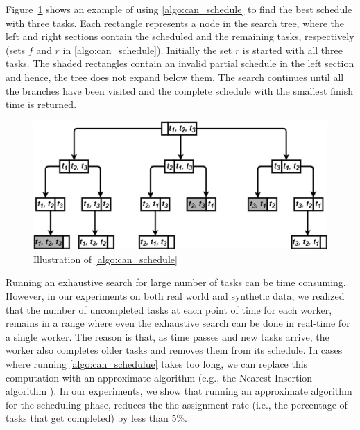 Figure~\ref{fig:bAndb} shows an example of using \cref{algo:can_schedule} to find the best schedule with three tasks. Each rectangle represents a node in the search tree, where the left and right sections contain the scheduled and the remaining tasks, respectively (sets $f$ and $r$ in \cref{algo:can_schedule}). Initially the set $r$ is started with all three tasks. The shaded rectangles contain an invalid partial schedule in the left section and hence, the tree does not expand below them. The search continues until all the branches have been visited and the complete schedule with the smallest finish time is returned.

\begin{figure}[!ht]
	\centering
	\includegraphics[width=0.75\columnwidth]{figures/bAndb}
	\vspace{-0mm}\caption{Illustration of \cref{algo:can_schedule}} \vspace{-2mm} \label{fig:bAndb}
\end{figure}\vspace{-0mm}

Running an exhaustive search for large number of tasks can be time consuming. However, in our experiments on both real world and synthetic data, we realized that the number of uncompleted tasks at each point of time for each worker, remains in a range where even the exhaustive search can be done in real-time for a single worker. The reason is that, as time passes and new tasks arrive, the worker also completes older tasks and removes them from its schedule. In cases where running \cref{algo:can_schedulue} takes too long, we can replace this computation with an approximate algorithm (e.g., the Nearest Insertion algorithm \cite{Rosenkrantz74}). In our experiments, we show that running an approximate algorithm for the scheduling phase, reduces the  the assignment rate (i.e., the percentage of tasks that get completed) by less than 5\%.

